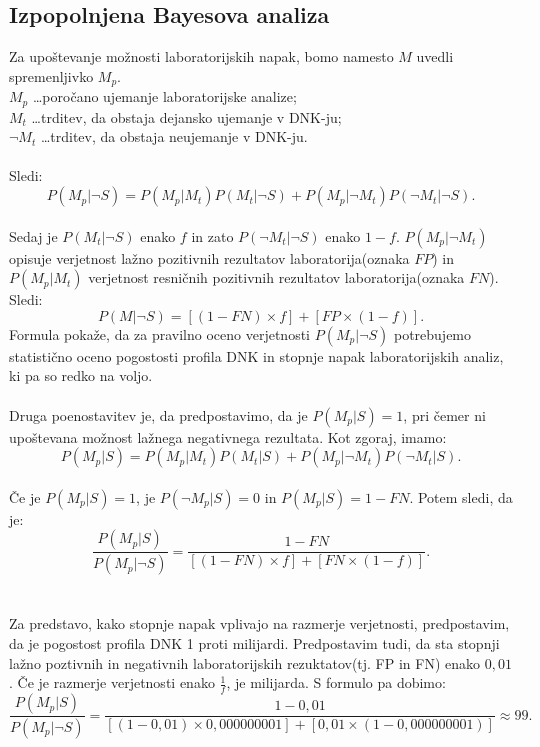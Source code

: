 \documentclass[12pt,a4paper]{amsart}
\theoremstyle{definition} %
\theoremstyle{plain} %
\begin{document}
\subsection{Izpopolnjena Bayesova analiza}
Za upoštevanje možnosti laboratorijskih napak, bomo namesto $M$ uvedli spremenljivko $M_p$.\\
$M_p$ \dots poročano ujemanje laboratorijske analize; \\
$M_t$ \dots trditev, da obstaja dejansko ujemanje v DNK-ju;\\
$\neg M_t$ \dots trditev, da obstaja neujemanje v DNK-ju.\\\\
Sledi:
\[
    P(M_p \lvert \neg S) = P(M_p \lvert M_t)P(M_t \lvert \neg S) + P(M_p \lvert \neg M_t)P(\neg M_t \lvert \neg S).
\]\\
Sedaj je $P(M_t \lvert \neg S)$ enako $f$ in zato $P(\neg M_t \lvert \neg S)$ enako $1-f$. $P(M_p \lvert \neg M_t)$ opisuje verjetnost lažno
pozitivnih rezultatov laboratorija(oznaka $FP$) in $P(M_p \lvert M_t)$ verjetnost resničnih pozitivnih rezultatov laboratorija(oznaka $FN$).
Sledi:
\[
    P(M \lvert \neg S) = [(1 - FN) \times f] + [FP \times (1 - f)].
\]
Formula pokaže, da za pravilno oceno verjetnosti $P(M_p \lvert \neg S)$ potrebujemo statistično oceno pogostosti profila DNK in stopnje napak
laboratorijskih analiz, ki pa so redko na voljo.\\\\
Druga poenostavitev je, da predpostavimo, da je $P(M_p \lvert S) = 1$, pri čemer ni upoštevana možnost lažnega negativnega rezultata. Kot zgoraj, 
imamo:
\[
    P(M_p \lvert S) = P(M_p \lvert M_t)P(M_t \lvert S) + P(M_p \lvert \neg M_t)P(\neg M_t \lvert S).
\]\\
Če je $P(M_p \lvert S) = 1$, je $P(\neg M_p \lvert S) = 0$ in $P(M_p \lvert S) = 1 - FN$. Potem sledi, da je:
\[
    \frac{P(M_p \lvert S)}{P(M_p \lvert \neg S)} = \frac{1 - FN}{[(1 - FN) \times f] + [FN \times (1 - f)]}.
\]\\\\
Za predstavo, kako stopnje napak vplivajo na razmerje verjetnosti, predpostavim, da je pogostost profila DNK 1 proti milijardi. Predpostavim 
tudi, da sta stopnji lažno poztivnih in negativnih laboratorijskih rezuktatov(tj. FP in FN) enako $0,01$. Če je razmerje verjetnosti enako 
$\frac{1}{f}$, je milijarda. S formulo pa dobimo:
\[
    \frac{P(M_p \lvert S)}{P(M_p \lvert \neg S)} = \frac{1 - 0,01}{[(1 - 0,01) \times 0,000000001] + [0,01 \times (1 - 0,000000001)]} \approx 99.
\]\\
\end{document}
